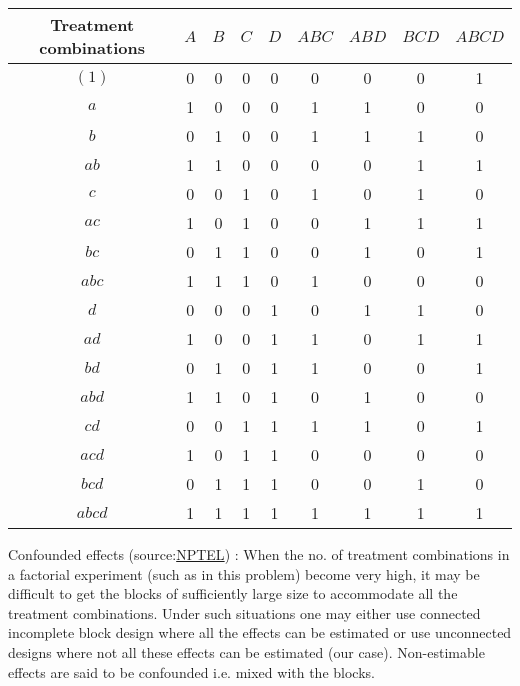 \documentclass{article}
\theoremstyle{remark}
\begin{document}
\begin{center}
\begin{tabular}{ ||c|c|c|c|c|c|c|c|c|| } 
 \hline
 Treatment combinations & $A$ & $B$ & $C$ & $D$ & $ABC$ & $ABD$ & $BCD$ & $ABCD$\\
 \hline
$(1)$  &    0   &   0   &   0   &   0   &   0   &   0   &   0   &   1   \\
 \hline
$a$    &    1   &   0   &   0   &   0   &   1   &   1   &   0   &   0   \\
 \hline
$b$    &    0   &   1   &   0   &   0   &   1   &   1   &   1   &   0   \\
 \hline
$ab$   &    1   &   1   &   0   &   0   &   0   &   0   &   1   &   1   \\
 \hline
$c$    &    0   &   0   &   1   &   0   &   1   &   0   &   1   &   0   \\
 \hline
$ac$   &    1   &   0   &   1   &   0   &   0   &   1   &   1   &   1   \\
 \hline
$bc$   &    0   &   1   &   1   &   0   &   0   &   1   &   0   &   1   \\
 \hline
$abc$  &    1   &   1   &   1   &   0   &   1   &   0   &   0   &   0   \\
 \hline
$d$    &    0   &   0   &   0   &   1   &   0   &   1   &   1   &   0   \\
 \hline
$ad$   &    1   &   0   &   0   &   1   &   1   &   0   &   1   &   1   \\
 \hline
$bd$   &    0   &   1   &   0   &   1   &   1   &   0   &   0   &   1   \\ 
 \hline
$abd$  &    1   &   1   &   0   &   1   &   0   &   1   &   0   &   0   \\
 \hline
$cd$   &    0   &   0   &   1   &   1   &   1   &   1   &   0   &   1   \\
 \hline
$acd$  &    1   &   0   &   1   &   1   &   0   &   0   &   0   &   0   \\
 \hline
$bcd$  &    0   &   1   &   1   &   1   &   0   &   0   &   1   &   0   \\
 \hline
$abcd$ &    1   &   1   &   1   &   1   &   1   &   1   &   1   &   1   \\
 \hline
\end{tabular}
\end{center}
\newpage
\begin{paragraph}{Confounded effects (source:\href{http://home.iitk.ac.in/~shalab/anova/chapter9-anova-confounding.pdf}{NPTEL}) : }
When the no. of treatment combinations in a factorial experiment (such as in this problem) become very high, it may be difficult to get the blocks of sufficiently large size to accommodate all the treatment combinations. Under such situations one may either use connected incomplete block design where all the effects can be estimated or use unconnected designs where not all these effects can be estimated (our case). Non-estimable effects are said to be confounded i.e. mixed with the blocks.
\end{paragraph}
\end{document}
